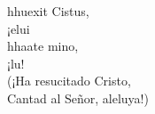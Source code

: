 \begin{cancion}%
	 hhuexit Cistus,\\
	¡elui \\
	 hhaate mino, \\
	¡lu! \\
(¡Ha resucitado Cristo,\\
Cantad al Señor, aleluya!)\\
\end{cancion}%
